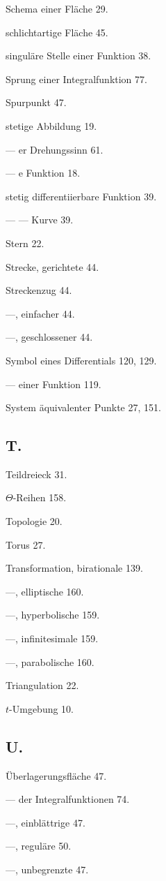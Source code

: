 \documentclass{article}
\begin{document}
Schema einer Fläche 29.

schlichtartige Fläche 45.

singuläre Stelle einer Funktion 38.

Sprung einer Integralfunktion 77.

Spurpunkt 47.

stetige Abbildung 19.

--- er Drehungssinn 61.

--- e Funktion 18.

stetig differentiierbare Funktion 39.

--- --- Kurve 39.

Stern 22.

Strecke, gerichtete 44.

Streckenzug 44.

---, einfacher 44.

---, geschlossener 44.

Symbol eines Differentials 120, 129.

--- einer Funktion 119.

System äquivalenter Punkte 27, 151.

\subsection*{T.}

Teildreieck 31.

$\Theta$-Reihen 158.

Topologie 20.

Torus 27.

Transformation, birationale 139.

---, elliptische 160.

---, hyperbolische 159.

---, infinitesimale 159.

---, parabolische 160.

Triangulation 22.

$t$-Umgebung 10.

\subsection*{U.}

Überlagerungsfläche 47.

--- der Integralfunktionen 74.

---, einblättrige 47.

---, reguläre 50.

---, unbegrenzte 47.
\end{document}
